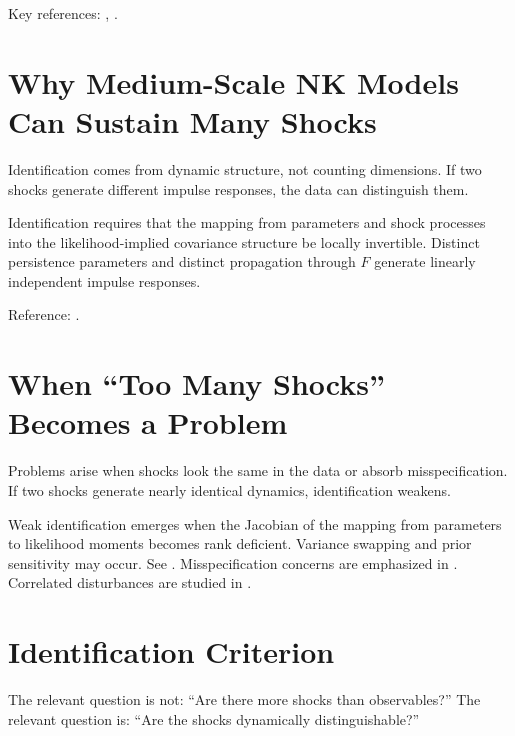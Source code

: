 \documentclass[11pt]{article}
\begin{document}
Key references: \citet{durbin2012}, \citet{hamilton1994}.

\section{Why Medium-Scale NK Models Can Sustain Many Shocks}

\begin{intuitionbox}
Identification comes from dynamic structure, not counting dimensions.
If two shocks generate different impulse responses, the data can distinguish them.
\end{intuitionbox}

\begin{technicalbox}
Identification requires that the mapping from parameters and shock processes
into the likelihood-implied covariance structure be locally invertible.
Distinct persistence parameters and distinct propagation through $F$ generate
linearly independent impulse responses.
\end{technicalbox}

Reference: \citet{smets2007}.

\section{When ``Too Many Shocks'' Becomes a Problem}

\begin{intuitionbox}
Problems arise when shocks look the same in the data or absorb misspecification.
If two shocks generate nearly identical dynamics, identification weakens.
\end{intuitionbox}

\begin{technicalbox}
Weak identification emerges when the Jacobian of the mapping from parameters
to likelihood moments becomes rank deficient.
Variance swapping and prior sensitivity may occur.
See \citet{iskrev2010}.
Misspecification concerns are emphasized in \citet{denhaan2021asd}.
Correlated disturbances are studied in \citet{curdia2012}.
\end{technicalbox}

\section{Identification Criterion}

\begin{intuitionbox}
The relevant question is not:
``Are there more shocks than observables?''
The relevant question is:
``Are the shocks dynamically distinguishable?''
\end{intuitionbox}
\end{document}
